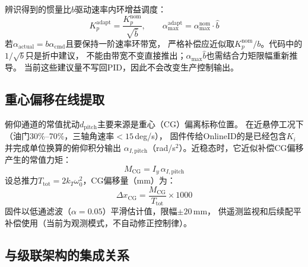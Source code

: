辨识得到的惯量比$\hat{b}$驱动速率内环增益调度：
\begin{equation}
    \boxed{
    K_p^{\mathrm{adapt}} = \frac{K_p^{\mathrm{nom}}}{\sqrt{\hat{b}}},
    \qquad
    \alpha_{\max}^{\mathrm{adapt}} = \alpha_{\max}^{\mathrm{nom}}\cdot\hat{b}
    }
    \label{eq:gain_scheduling}
\end{equation}
若$\alpha_{\mathrm{actual}}=b\alpha_{\mathrm{cmd}}$且要保持一阶速率环带宽，
严格补偿应近似取$K_p^{\mathrm{nom}}/b$。代码中的$1/\sqrt b$只是折中建议，
不能由带宽不变直接推出；$\alpha_{\max}\hat b$也需结合力矩限幅重新推导。
当前这些建议量不写回PID，因此不会改变生产控制输出。

\subsection{重心偏移在线提取}
\label{sec:cg_extraction}

俯仰通道的常值扰动$d_{\mathrm{pitch}}$主要来源是重心（CG）偏离标称位置。
在近悬停工况下（油门30\%--70\%，三轴角速率$<15$\,deg/s），
固件传给OnlineID的是已经包含$K_i$并完成单位换算的俯仰积分输出
$\alpha_{I,\mathrm{pitch}}$（rad/s$^2$）。近稳态时，它近似补偿CG偏移产生的常值力矩：
\begin{equation}
    M_{\mathrm{CG}} = I_y\,\alpha_{I,\mathrm{pitch}}
    \label{eq:cg_moment}
\end{equation}
设总推力$T_{\mathrm{tot}}=2k_T\omega_0^2$，CG偏移量（mm）为：
\begin{equation}
    \Delta x_{\mathrm{CG}} = \frac{M_{\mathrm{CG}}}{T_{\mathrm{tot}}}\times1000
    \label{eq:cg_offset}
\end{equation}
固件以低通滤波（$\alpha=0.05$）平滑估计值，限幅$\pm20$\,mm，
供遥测监视和后续配平补偿使用（当前为观测模式，不自动修正控制律）。

\subsection{与级联架构的集成关系}
\label{sec:adrc_integration}

